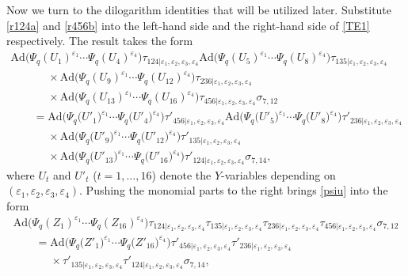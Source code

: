 \documentclass[pdftex]{sigma}
\numberwithin{equation}{section}
\begin{document}
Now we turn to the dilogarithm identities that will be utilized later.
Substitute \eqref{r124a} and \eqref{r456b} into the
left-hand side and the right-hand side of \eqref{TE1} respectively.
The result takes the form
\begin{gather}
\mathrm{Ad}\bigl(
\Psi_q(U_1)^{\varepsilon_1} \dotsm \Psi_q(U_4)^{\varepsilon_4}\bigr)
\tau_{124| \varepsilon_1, \varepsilon_2, \varepsilon_3, \varepsilon_4}
\mathrm{Ad}\bigl(
\Psi_q(U_5)^{\varepsilon_1} \dotsm \Psi_q(U_8)^{\varepsilon_4}\bigr)
\tau_{135| \varepsilon_1, \varepsilon_2, \varepsilon_3, \varepsilon_4}\nonumber
\\
\phantom{\qquad =}{}\times
\mathrm{Ad}\bigl(
\Psi_q(U_9)^{\varepsilon_1} \dotsm \Psi_q(U_{12})^{\varepsilon_4}\bigr)
\tau_{236 | \varepsilon_1, \varepsilon_2, \varepsilon_3, \varepsilon_4}\nonumber
\\
\phantom{\qquad =}{}\times
\mathrm{Ad}\bigl(
\Psi_q(U_{13})^{\varepsilon_1} \dotsm \Psi_q(U_{16})^{\varepsilon_4}\bigr)
\tau_{456| \varepsilon_1, \varepsilon_2, \varepsilon_3, \varepsilon_4}\sigma_{7,12}\nonumber
\\
\qquad {}=
\mathrm{Ad}\bigl(
\Psi_q\bigl(U'_1\bigr)^{\varepsilon_1} \dotsm \Psi_q\bigl(U'_4\bigr)^{\varepsilon_4}\bigr)
\tau'_{456| \varepsilon_1, \varepsilon_2, \varepsilon_3, \varepsilon_4}
\mathrm{Ad}\bigl(
\Psi_q\bigl(U'_5\bigr)^{\varepsilon_1} \dotsm \Psi_q\bigl(U'_8\bigr)^{\varepsilon_4}\bigr)
\tau'_{236| \varepsilon_1, \varepsilon_2, \varepsilon_3, \varepsilon_4}\nonumber
\\
\phantom{\qquad =}{} \times
\mathrm{Ad}\bigl(
\Psi_q\bigl(U'_9\bigr)^{\varepsilon_1} \dotsm \Psi_q\bigl(U'_{12}\bigr)^{\varepsilon_4}\bigr)
\tau'_{135| \varepsilon_1, \varepsilon_2, \varepsilon_3, \varepsilon_4}\nonumber
\\
\phantom{\qquad =}{} \times
\mathrm{Ad}\bigl(
\Psi_q\bigl(U'_{13}\bigr)^{\varepsilon_1} \dotsm \Psi_q\bigl(U'_{16}\bigr)^{\varepsilon_4}\bigr)
\tau'_{124| \varepsilon_1, \varepsilon_2, \varepsilon_3, \varepsilon_4}\sigma_{7,14},\label{psiu}
\end{gather}
where $U_t$ and $U'_t$ ($t=1, \dots, 16$) denote the $Y$-variables
depending on
$(\varepsilon_1, \varepsilon_2, \varepsilon_3, \varepsilon_4)$.
%
Pushing the monomial parts to the right brings \eqref{psiu} into the form
\begin{gather}
\mathrm{Ad}\bigl(\Psi_q(Z_1)^{\varepsilon_1}\dotsm \Psi_q(Z_{16})^{\varepsilon_{4}}\bigr)
\tau_{124|\varepsilon_1,\varepsilon_2,\varepsilon_3,\varepsilon_4}
\tau_{135|\varepsilon_1,\varepsilon_2,\varepsilon_3,\varepsilon_4}
\tau_{236|\varepsilon_1,\varepsilon_2,\varepsilon_3,\varepsilon_4}
\tau_{456|\varepsilon_1,\varepsilon_2,\varepsilon_3,\varepsilon_4}\sigma_{7,12}\nonumber
\\
\qquad=
\mathrm{Ad}\bigl(\Psi_q\bigl(Z'_1\bigr)^{\varepsilon_1}\dotsm \Psi_q\bigl(Z'_{16}\bigr)^{\varepsilon_{4}}\bigr)
\tau'_{456|\varepsilon_1,\varepsilon_2,\varepsilon_3,\varepsilon_4}
\tau'_{236|\varepsilon_1,\varepsilon_2,\varepsilon_3,\varepsilon_4}\nonumber
\\
\phantom{\qquad=}{}\times
\tau'_{135|\varepsilon_1,\varepsilon_2,\varepsilon_3,\varepsilon_4}
\tau'_{124|\varepsilon_1,\varepsilon_2,\varepsilon_3,\varepsilon_4}\sigma_{7,14},\label{zteq}
\end{gather}
\end{document}
